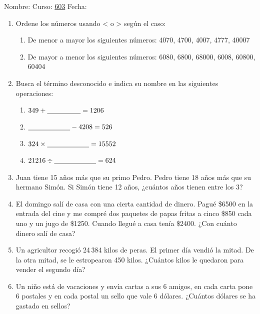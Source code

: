 \documentclass[fleqn]{article}
\newcommand{\LineaNombre}{%
\par
\vspace{\baselineskip}
Nombre:\hrulefill \; Curso: \underline{603} \; Fecha: \underline{\hspace*{2.5cm}} \relax
\par}
\begin{document}
\LineaNombre
\begin{enumerate}
   \item Ordene los números usando < o > según el caso: 
      \begin{enumerate}
	 \item De menor a mayor los siguientes números: 4070, 4700, 4007, 4777, 40007\noanswer
	 \item De mayor a menor los siguientes números: 6080, 6800, 68000, 6008, 60800, 60404\noanswer
      \end{enumerate}
   \item Busca el término desconocido e indica su nombre en las siguientes operaciones:
   \begin{enumerate}
   \item $349+\underline{\hspace*{48pt}}=1206$\noanswer
   \item $\underline{\hspace*{60pt}}-4208=526$\noanswer
   \item $324\times \underline{\hspace*{60pt}}=15552 $\noanswer
   \item $21216\div \underline{\hspace*{60pt}}=624$\noanswer
   \end{enumerate}
   \item Juan tiene 15 años más que su primo Pedro. Pedro tiene 18 años más que su hermano Simón. Si Simón tiene 12 años, ¿cuántos años tienen entre los 3?\noanswer[2in]
   \newpage
   \item El domingo salí de casa con una cierta cantidad de dinero. Pagué \$6500 en la
entrada del cine y me compré dos paquetes de papas fritas a cinco \$850 cada uno y un
jugo de \$1250. Cuando llegué a casa tenía \$2400. ¿Con cuánto dinero salí
de casa?\noanswer
\item Un agricultor recogió 24\,384 kilos de peras. El primer día vendió la mitad. De la otra
mitad, se le estropearon 450 kilos. ¿Cuántos kilos le quedaron para vender el segundo
día?\noanswer
\item Un niño está de vacaciones y envía cartas a sus 6 amigos, en cada carta pone 6 postales y en cada postal un sello que vale 6 dólares. ¿Cuántos dólares se ha gastado en sellos?\noanswer
\end{enumerate}
\end{document}
